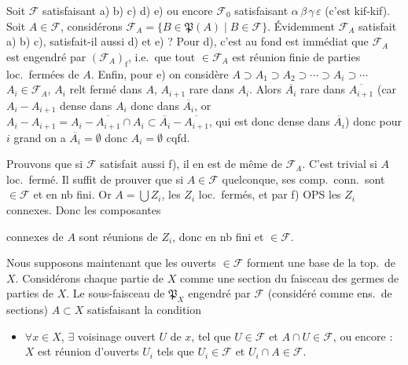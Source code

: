 \documentclass[11pt,a4paper]{article}
\begin{document}
Soit $\mathcal{F}$ satisfaisant a) b) c) d) e) ou encore $\mathcal{F}_0$
satisfaisant $\alpha\,\beta\,\gamma\,\varepsilon$ (c'est kif-kif). Soit $A \in
\mathcal{F}$, considérons $\mathcal{F}_A = \lbrace B \in \mathfrak{P}(A) \mid
B \in \mathcal{F} \rbrace$. Évidemment $\mathcal{F}_A$ satisfait a) b) c),
satisfait-il aussi d) et e) ? Pour d), c'est  au fond
 est immédiat que $\mathcal{F}_A$ est engendré par
$(\mathcal{F}_A)_{\mathrm{f}}$, i.e.\ que tout $\in \mathcal{F}_A$ est
réunion finie de parties loc.\ fermées  de $A$. \ill{}
Enfin, pour e) on considère $A \supset A_1 \supset A_2 \supset \cdots \supset
A_i \supset \cdots$ $A_i \in \mathcal{F}_A$, $A_i$ relt fermé
dans $A$, $A_{i+1}$ rare dans $A_i$. Alors $\overline{A_i}$ rare dans
$\overline{A_{i+1}}$  (car $A_i - A_{i+1}$
dense dans $A_i$ donc dans $\overline{A_i}$,  or
$A_i - A_{i+1} = A_i - \overline{A_{i+1}} \cap A_i \subset \overline{A_i} -
\overline{A_{i+1}}$, qui est donc dense dans $\overline{A_i}$) donc pour $i$
grand on a $\overline{A_i} = \emptyset$ donc $A_i = \emptyset$ cqfd.


Prouvons que si $\mathcal{F}$ satisfait aussi f), il en est de même de
$\mathcal{F}_A$. C'est trivial si $A$ loc.\ fermé. Il suffit de prouver que
si $A \in \mathcal{F}$ quelconque, ses comp.\ conn.\ sont $\in \mathcal{F}$ et
en nb fini. Or $A = \bigcup Z_i$, les $Z_i$ loc.\ fermés, et par f) OPS les
$Z_i$ connexes. Donc les composantes

connexes de $A$ sont réunions de $Z_i$, donc en nb fini et $\in
\mathcal{F}$.

Nous supposons maintenant que les ouverts $\in \mathcal{F}$ forment une base
de la top.\ de $X$. Considérons chaque partie de $X$ comme une section du
faisceau  des germes de parties de $X$. Le
sous-faisceau  \struck{\ill{}} de
$\mathfrak{P}_X$ engendré par $\mathcal{F}$ (considéré comme ens.\ de
sections)    $A \subset X$ satisfaisant la condition
\begin{itemize}
  \item[a)] $\forall x \in X$, $\exists$ voisinage ouvert $U$ de $x$, tel que
  $U \in \mathcal{F}$ et $A \cap U \in \mathcal{F}$, ou encore : $X$ est
  réunion d'ouverts $U_i$ tels que $U_i \in \mathcal{F}$ et $U_i \cap A \in
  \mathcal{F}$.
\end{itemize}
\end{document}
